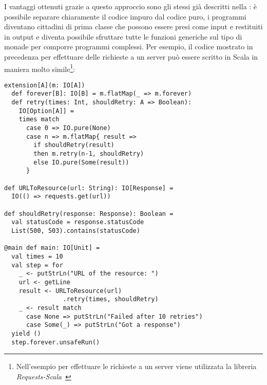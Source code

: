 I vantaggi ottenuti grazie a questo approccio sono gli stessi già descritti nella : è possibile separare chiaramente il codice impuro dal codice puro, i programmi diventano cittadini di prima classe che possono essere presi come input e restituiti in output e diventa possibile sfruttare tutte le funzioni generiche sul tipo di monade per comporre programmi complessi. Per esempio, il codice mostrato in precedenza per effettuare delle richieste a un server può essere scritto in Scala in maniera molto simile\footnote{Nell'esempio per effettuare le richieste a un server viene utilizzata la libreria \emph{Requests-Scala}~\cite{cit:requests-scala}}:
\begin{lstlisting}[language=scala3]
extension[A](m: IO[A])
  def forever[B]: IO[B] = m.flatMap(_ => m.forever)
  def retry(times: Int, shouldRetry: A => Boolean):
    IO[Option[A]] =
    times match
      case 0 => IO.pure(None)
      case n => m.flatMap{ result => 
        if shouldRetry(result)
        then m.retry(n-1, shouldRetry)
        else IO.pure(Some(result))
      }

def URLToResource(url: String): IO[Response] =
  IO(() => requests.get(url))

def shouldRetry(response: Response): Boolean = 
  val statusCode = response.statusCode
  List(500, 503).contains(statusCode)

@main def main: IO[Unit] = 
  val times = 10
  val step = for 
    _ <- putStrLn("URL of the resource: ")
    url <- getLine
    result <- URLToResource(url)
                .retry(times, shouldRetry)
    _ <- result match
      case None => putStrLn("Failed after 10 retries")
      case Some(_) => putStrLn("Got a response")
  yield ()
  step.forever.unsafeRun()
\end{lstlisting}
